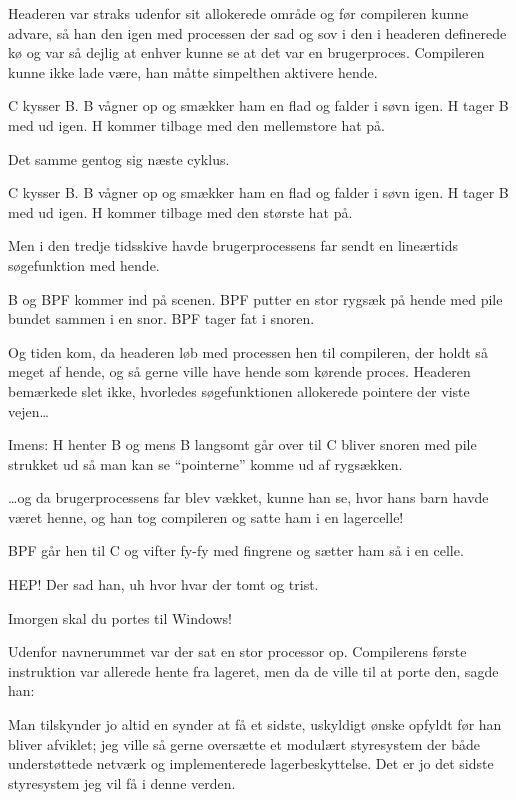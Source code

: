 \documentclass[danish]{article}
\begin{document}
\begin{sketch}
 Headeren var straks udenfor sit allokerede område 
og før compileren kunne advare, så han den igen med processen  der sad og sov i den i headeren definerede kø og
var så dejlig at enhver kunne se at det var en brugerproces. Compileren kunne
ikke lade være, han måtte simpelthen aktivere hende.

\scene C kysser B. B vågner op og smækker ham en flad og falder i søvn igen. H
tager B med ud igen. H kommer tilbage med den mellemstore hat på.

 Det samme gentog sig næste cyklus.

\scene C kysser B. B vågner op og smækker ham en flad og falder i søvn igen. H
tager B med ud igen. H kommer tilbage med den største hat på.

 Men i den tredje tidsskive havde brugerprocessens far sendt en
lineærtids søgefunktion med hende. 

\scene B og BPF kommer ind på scenen. BPF putter en stor rygsæk på hende med
pile bundet sammen i en snor. BPF tager fat i snoren.

 Og tiden kom, da headeren løb med processen hen til compileren, der
holdt så meget af hende, og så gerne ville have hende som kørende proces.
Headeren bemærkede slet ikke, hvorledes søgefunktionen allokerede pointere der
viste vejen\ldots

\scene Imens: H henter B og mens B langsomt går over til C bliver snoren med
pile strukket ud så man kan se ``pointerne'' komme ud af rygsækken.

 \ldots{}og da brugerprocessens far blev vækket, kunne han se, hvor hans
barn havde været henne, og han tog compileren og satte ham i en lagercelle!

\scene BPF går hen til C og vifter fy-fy med fingrene og sætter ham så i en celle.

 HEP! Der sad han, uh hvor hvar der tomt og trist.

 Imorgen skal du portes til Windows!

 Udenfor navnerummet var der sat en stor processor op. Compilerens
første instruktion var allerede hente fra lageret, men da de ville til at porte
den, sagde han:

 Man tilskynder jo altid en synder at få et sidste, uskyldigt ønske
opfyldt før han bliver afviklet; jeg ville så gerne oversætte et modulært
styresystem der både understøttede netværk og implementerede lagerbeskyttelse.
Det er jo det sidste styresystem jeg vil få i denne verden.


\end{sketch}
\end{document}
